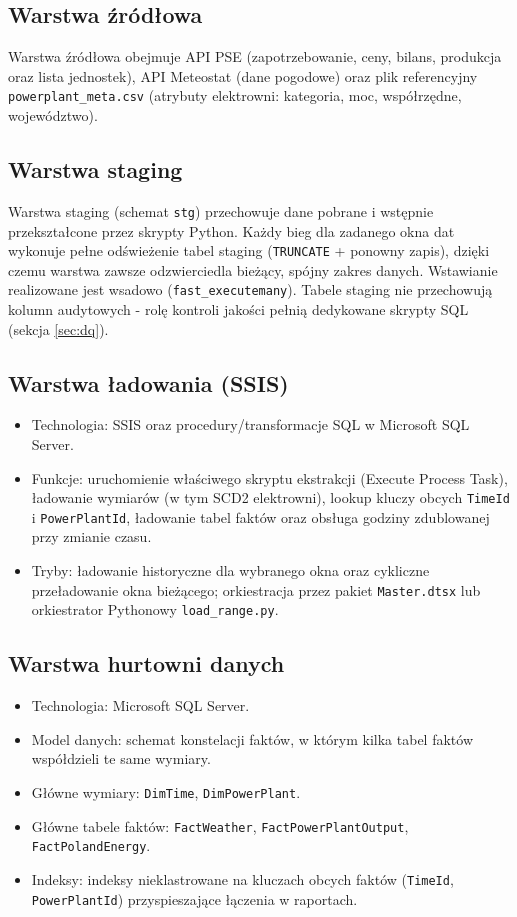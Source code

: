 \documentclass[12pt]{article}
\begin{document}
	\subsection{Warstwa źródłowa}
	Warstwa źródłowa obejmuje API PSE (zapotrzebowanie, ceny, bilans, produkcja oraz lista jednostek), API Meteostat (dane pogodowe) oraz plik referencyjny \texttt{powerplant\_meta.csv} (atrybuty elektrowni: kategoria, moc, współrzędne, województwo).

	\subsection{Warstwa staging}
	Warstwa staging (schemat \texttt{stg}) przechowuje dane pobrane i wstępnie przekształcone przez skrypty Python. Każdy bieg dla zadanego okna dat wykonuje pełne odświeżenie tabel staging (\texttt{TRUNCATE} + ponowny zapis), dzięki czemu warstwa zawsze odzwierciedla bieżący, spójny zakres danych. Wstawianie realizowane jest wsadowo (\texttt{fast\_executemany}). Tabele staging nie przechowują kolumn audytowych - rolę kontroli jakości pełnią dedykowane skrypty SQL (sekcja \ref{sec:dq}).

	\subsection{Warstwa ładowania (SSIS)}
	\begin{itemize}
		\item Technologia: SSIS oraz procedury/transformacje SQL w Microsoft SQL Server.
		\item Funkcje: uruchomienie właściwego skryptu ekstrakcji (Execute Process Task), ładowanie wymiarów (w tym SCD2 elektrowni), lookup kluczy obcych \texttt{TimeId} i \texttt{PowerPlantId}, ładowanie tabel faktów oraz obsługa godziny zdublowanej przy zmianie czasu.
		\item Tryby: ładowanie historyczne dla wybranego okna oraz cykliczne przeładowanie okna bieżącego; orkiestracja przez pakiet \texttt{Master.dtsx} lub orkiestrator Pythonowy \texttt{load\_range.py}.
	\end{itemize}

	\subsection{Warstwa hurtowni danych}
	\begin{itemize}
		\item Technologia: Microsoft SQL Server.
		\item Model danych: schemat konstelacji faktów, w którym kilka tabel faktów współdzieli te same wymiary.
		\item Główne wymiary: \texttt{DimTime}, \texttt{DimPowerPlant}.
		\item Główne tabele faktów: \texttt{FactWeather}, \texttt{FactPowerPlantOutput}, \texttt{FactPolandEnergy}.
		\item Indeksy: indeksy nieklastrowane na kluczach obcych faktów (\texttt{TimeId}, \texttt{PowerPlantId}) przyspieszające łączenia w raportach.
	\end{itemize}
\end{document}
